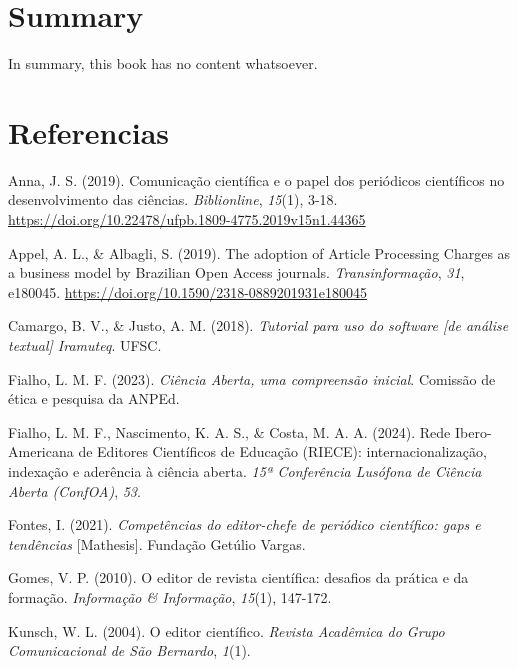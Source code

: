 \documentclass[
  a4paper,
]{book}
\newlength{\cslhangindent}
\newenvironment{CSLReferences}[2] %
 {\begin{list}{}{%
  \setlength{\itemindent}{0pt}
  \setlength{\leftmargin}{0pt}
  \setlength{\parsep}{0pt}
  \ifodd #1
   \setlength{\leftmargin}{\cslhangindent}
   \setlength{\itemindent}{-1\cslhangindent}
  \fi
  \setlength{\itemsep}{#2\baselineskip}}}
 {\end{list}}
\begin{document}

\chapter{Summary}\label{summary}

In summary, this book has no content whatsoever.

\chapter*{Referencias}\label{bibliography}

\label{refs}
\begin{CSLReferences}{1}{0}
Anna, J. S. (2019). Comunicação científica e o papel dos periódicos
científicos no desenvolvimento das ciências. \emph{Biblionline},
\emph{15}(1), 3-18.
\url{https://doi.org/10.22478/ufpb.1809-4775.2019v15n1.44365}

Appel, A. L., \& Albagli, S. (2019). The adoption of Article Processing
Charges as a business model by Brazilian Open Access journals.
\emph{Transinformação}, \emph{31}, e180045.
\url{https://doi.org/10.1590/2318-0889201931e180045}

Camargo, B. V., \& Justo, A. M. (2018). \emph{Tutorial para uso do
software {[}de análise textual{]} Iramuteq}. UFSC.

Fialho, L. M. F. (2023). \emph{Ciência Aberta, uma compreensão inicial}.
Comissão de ética e pesquisa da ANPEd.

Fialho, L. M. F., Nascimento, K. A. S., \& Costa, M. A. A. (2024). Rede
Ibero-Americana de Editores Científicos de Educação (RIECE):
internacionalização, indexação e aderência à ciência aberta. \emph{15ª
Conferência Lusófona de Ciência Aberta (ConfOA)}, \emph{53}.

Fontes, I. (2021). \emph{Competências do editor-chefe de periódico
científico: gaps e tendências} {[}Mathesis{]}. Fundação Getúlio Vargas.

Gomes, V. P. (2010). O editor de revista científica: desafios da prática
e da formação. \emph{Informação \& Informação}, \emph{15}(1), 147-172.

Kunsch, W. L. (2004). O editor científico. \emph{Revista Acadêmica do
Grupo Comunicacional de São Bernardo}, \emph{1}(1).


\end{CSLReferences}
\end{document}
